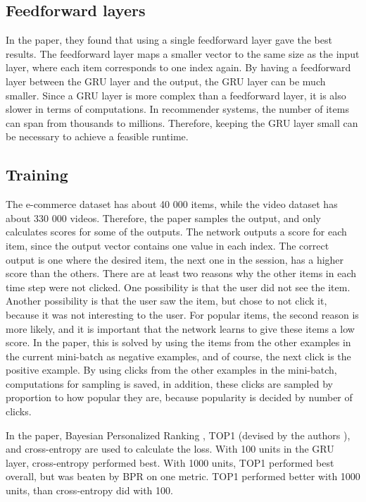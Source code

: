 \subsection{Feedforward layers}
In the paper, they found that using a single feedforward layer gave the best results. The feedforward layer maps a smaller vector to the same size as the input layer, where each item corresponds to one index again. By having a feedforward layer between the GRU layer and the output, the GRU layer can be much smaller. Since a GRU layer is more complex than a feedforward layer, it is also slower in terms of computations. In recommender systems, the number of items can span from thousands to millions. Therefore, keeping the GRU layer small can be necessary to achieve a feasible runtime.

\subsection{Training}
The e-commerce dataset has about 40 000 items, while the video dataset has about 330 000 videos. Therefore, the paper samples the output, and only calculates scores for some of the outputs. The network outputs a score for each item, since the output vector contains one value in each index. The correct output is one where the desired item, the next one in the session, has a higher score than the others. There are at least two reasons why the other items in each time step were not clicked. One possibility is that the user did not see the item. Another possibility is that the user saw the item, but chose to not click it, because it was not interesting to the user. For popular items, the second reason is more likely, and it is important that the network learns to give these items a low score. In the paper, this is solved by using the items from the other examples in the current mini-batch as negative examples, and of course, the next click is the positive example. By using clicks from the other examples in the mini-batch, computations for sampling is saved, in addition, these clicks are sampled by proportion to how popular they are, because popularity is decided by number of clicks.

In the paper, Bayesian Personalized Ranking \cite{Rendle:2009:BBP:1795114.1795167}, TOP1 (devised by the authors \cite{DBLP:journals/corr/HidasiKBT15}), and cross-entropy are used to calculate the loss. With 100 units in the GRU layer, cross-entropy performed best. With 1000 units, TOP1 performed best overall, but was beaten by BPR on one metric. TOP1 performed better with 1000 units, than cross-entropy did with 100.

